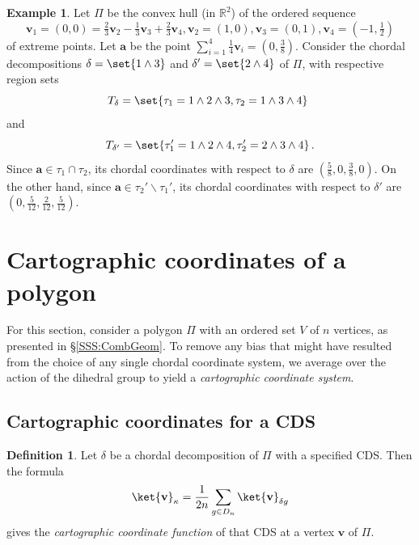 \documentclass[12pt]{amsart}
\theoremstyle{plain}
\theoremstyle{definition}
\newtheorem{definition}[theorem]{Definition}
\newtheorem{example}[theorem]{Example}
\numberwithin{equation}{section}
\begin{document}
\begin{example}\label{X:ChordFun}
Let $\Pi$ be the convex hull (in $\mathbb{R}^2$) of the ordered sequence
$$
\mathbf v_1=(0,0)
=\tfrac23\mathbf v_2-\tfrac13\mathbf v_3+\tfrac23\mathbf v_4,
\mathbf v_2=(1,0),
\mathbf v_3=(0,1),
\mathbf v_4=(-1,\tfrac{1}{2})
$$
of extreme points. Let $\mathbf a$ be the point $\sum_{i=1}^4\tfrac14\mathbf v_i=(0,\frac38)$.
Consider the chordal decompositions $\delta=\set{1\wedge 3}$ and $\delta'=\set{2\wedge 4}$ of $\Pi$, with respective region sets
$$
T_{\delta}=\set{\tau_{1}=1\wedge2\wedge3,\tau_{2}=1\wedge3\wedge4}\phantom{\,.}
$$
and
$$
T_{\delta'}=\set{\tau_{1}'=1\wedge2\wedge4,\tau_{2}'=2\wedge3\wedge4}\,.
$$
Since $\mathbf a\in\tau_1\cap\tau_2$, its chordal coordinates with respect to $\delta$ are $\left(\frac58,0,\frac38,0\right)$. On the other hand, since $\mathbf a\in\tau_2'\smallsetminus\tau_1'$, its chordal coordinates with respect to $\delta'$ are $\left(0,\frac5{12},\frac2{12},\frac5{12}\right)$.
\end{example}






\section{Cartographic coordinates of a polygon}\label{SS:CartoCor}


For this section, consider a polygon $\Pi$ with an ordered set $V$ of $n$ vertices, as presented in \S\ref{SSS:CombGeom}. To remove any bias that might have resulted from the choice of any single chordal coordinate system, we average over the action of the dihedral group to yield a \emph{cartographic coordinate system}.



\subsection{Cartographic coordinates for a CDS}\label{SSS:CartoCDS}



\begin{definition}\label{D:CartoCDS}
Let $\delta$ be a chordal decomposition of $\Pi$ with a specified CDS. Then the formula
\begin{equation}\label{E:CartoCDS}
\ket{\mathbf v}_\kappa=
\frac1{2n}\sum_{g\in D_n}\ket{\mathbf v}_{\delta g}
\end{equation}
gives the \emph{cartographic coordinate function} of that CDS at a vertex $\mathbf v$ of $\Pi$.
\end{definition}
\end{document}
